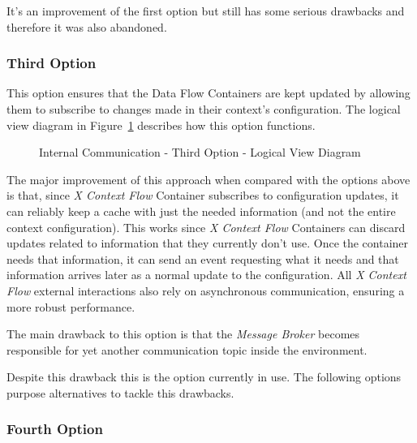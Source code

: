 It's an improvement of the first option but still has some serious drawbacks and therefore it was also abandoned. 

\subsubsection{Third Option}
\label{subsubsec:design:alternatives:internal:third}

This option ensures that the Data Flow Containers are kept updated by allowing them to subscribe to changes made in their context's configuration. The logical view diagram in Figure~\ref{fig:design:alternatives:internal:third:diagram} describes how this option functions.

\begin{figure}[H]
   \centering
   \resizebox{\columnwidth}{!}
   {
      
   }
   \caption[Internal Communication - Third Option - Logical View Diagram]{Internal Communication - Third Option - Logical View Diagram}
   \label{fig:design:alternatives:internal:third:diagram}
\end{figure}

The major improvement of this approach when compared with the options above is that, since \textit{X Context Flow} Container subscribes to configuration updates, it can reliably keep a cache with just the needed information (and not the entire context configuration). This works since \textit{X Context Flow} Containers can discard updates related to information that they currently don't use. Once the container needs that information, it can send an event requesting what it needs and that information arrives later as a normal update to the configuration. 
All \textit{X Context Flow} external interactions also rely on asynchronous communication, ensuring a more robust performance.

The main drawback to this option is that the \textit{Message Broker} becomes responsible for yet another communication topic inside the environment.

Despite this drawback this is the option currently in use. The following options purpose alternatives to tackle this drawbacks.

\subsubsection{Fourth Option}
\label{subsubsec:design:alternatives:internal:fourth}

